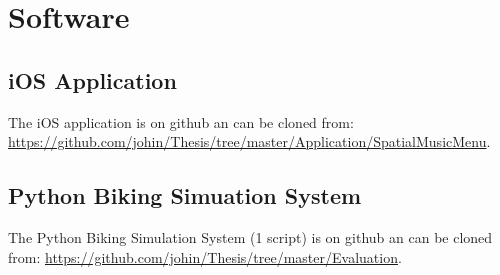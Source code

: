\chapter{Software}

\section{iOS Application}
\label{sec:appendixios}
The iOS application is on github an can be cloned from: \url{https://github.com/johin/Thesis/tree/master/Application/SpatialMusicMenu}.


\section{Python Biking Simuation System}
\label{sec:appendixpython}
The Python Biking Simulation System (1 script) is on github an can be cloned from: \url{https://github.com/johin/Thesis/tree/master/Evaluation}.